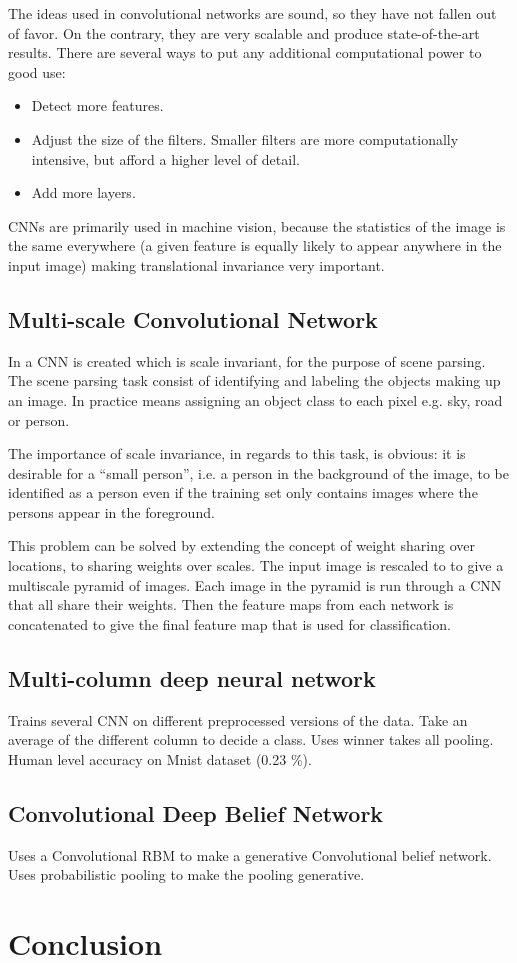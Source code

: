 \documentclass[11pt]{article}
\begin{document}
The ideas used in convolutional networks are sound, so they have not fallen out of favor.  On the contrary, they are very scalable and produce state-of-the-art results.  There are several ways to put any additional computational power to good use:
\begin{itemize}
\item Detect more features.
\item Adjust the size of the filters.  Smaller filters are more computationally intensive, but afford a higher level of detail.
\item Add more layers.
\end{itemize}

CNNs are primarily used in machine vision, because the statistics of the image is the same everywhere (a given feature is equally likely to appear anywhere in the input image) making translational invariance very important.

\subsection{Multi-scale Convolutional Network}

In \cite{farabet} a CNN is created which is scale invariant, for the purpose of scene parsing.  The scene parsing task consist of identifying and labeling the objects making up an image.  In practice means assigning an object class to each pixel e.g. sky, road or person.

The importance of scale invariance, in regards to this task, is obvious: it is desirable for a ``small person'', i.e. a person in the background of the image, to be identified as a person even if the training set only contains images where the persons appear in the foreground.

This problem can be solved by extending the concept of weight sharing over locations, to sharing weights over scales. The input image is rescaled to to give a multiscale pyramid of images. Each image in the pyramid is run through a CNN that all share their weights. Then the feature maps from each network is concatenated to give the final feature map that is used for classification.

\subsection{Multi-column deep neural network}
\cite{ciresan}
Trains several CNN on different preprocessed versions of the data. Take an average
of the different column to decide a class. Uses winner takes all pooling.
Human level accuracy on Mnist dataset (0.23 \%).


\subsection{Convolutional Deep Belief Network}

\cite{lee}
Uses a Convolutional RBM to make a generative Convolutional belief network.
Uses probabilistic pooling to make the pooling generative.

\section{Conclusion}



\end{document}
